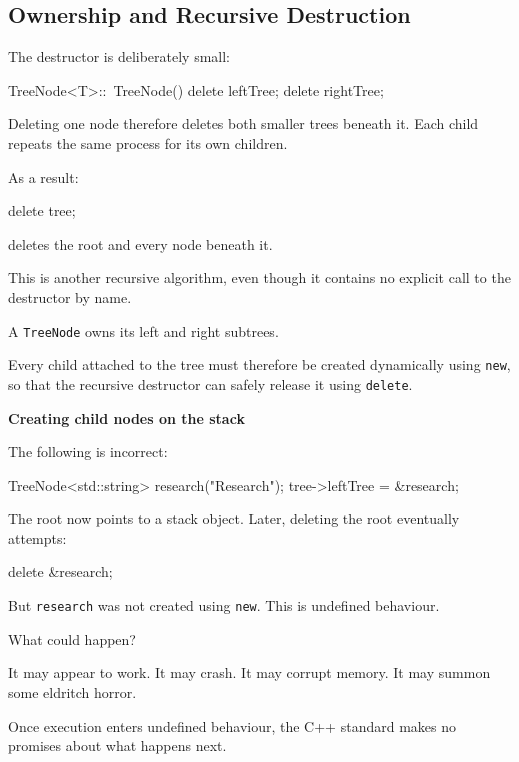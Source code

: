 \documentclass{csc2059practical}
\begin{document}
\subsection{Ownership and Recursive Destruction}

The destructor is deliberately small:

\begin{cppcode}
TreeNode<T>::~TreeNode()
{
    delete leftTree;
    delete rightTree;
}
\end{cppcode}

Deleting one node therefore deletes both smaller trees beneath it. Each child
repeats the same process for its own children.

As a result:

\begin{cppcode}
delete tree;
\end{cppcode}

deletes the root and every node beneath it.

This is another recursive algorithm, even though it contains no explicit call
to the destructor by name.

\begin{importantnote}
A \texttt{TreeNode} owns its left and right subtrees.

Every child attached to the tree must therefore be created dynamically using
\texttt{new}, so that the recursive destructor can safely release it
using \texttt{delete}.
\end{importantnote}

\begin{commonerror}
\textbf{Creating child nodes on the stack}

The following is incorrect:

\begin{cppcode}
TreeNode<std::string> research("Research");
tree->leftTree = &research;
\end{cppcode}

The root now points to a stack object. Later, deleting the root eventually
attempts:

\begin{cppcode}
delete &research;
\end{cppcode}

But \texttt{research} was not created using
\texttt{new}. This is undefined behaviour.

What could happen?

It may appear to work. It may crash. It may corrupt memory. It may summon some
eldritch horror.

Once execution enters undefined behaviour, the C++ standard makes no promises
about what happens next.
\end{commonerror}
\end{document}
